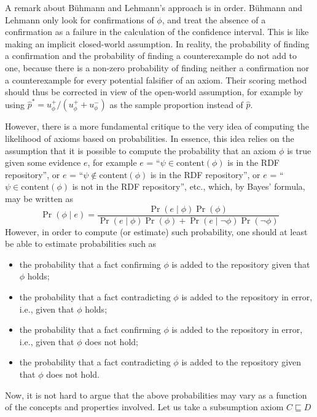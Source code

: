 \documentclass[review]{elsarticle}
\theoremstyle{definition}
\begin{document}
A remark about B\"uhmann and Lehmann's approach is in order.
B\"uhmann and Lehmann only look for confirmations of $\phi$, and treat
the absence of a confirmation as a failure in the calculation of the confidence interval.
This is like making an implicit closed-world assumption. In reality, the probability
of finding a confirmation and the probability of finding a counterexample do not add to one,
because there is a non-zero probability of finding neither a confirmation nor a counterexample
for every potential falsifier of an axiom. Their scoring method should thus be
corrected in view of the open-world assumption, for example by using
$\hat{p}^* = u_\phi^+/(u_\phi^+ + u_\phi^-)$ as the sample proportion instead of $\hat{p}$.

However, there is a more fundamental critique to the very idea of computing the likelihood
of axioms based on probabilities. In essence, this idea relies on the assumption
that it is possible to compute the probability that an axiom $\phi$ is true given
some evidence $e$, for example $e$ = ``$\psi \in \mathrm{content}(\phi)$ is in the RDF repository'',
or $e$ = ``$\psi \notin \mathrm{content}(\phi)$ is in the RDF repository'',
or $e$ = ``$\psi \in \mathrm{content}(\phi)$ is not in the RDF repository'', etc.,
which, by Bayes' formula, may be written as
\begin{equation}
  \Pr(\phi \mid e) =
    \frac{\Pr(e \mid \phi)\Pr(\phi)}{\Pr(e \mid \phi)\Pr(\phi) + \Pr(e \mid \neg\phi)\Pr(\neg\phi)}
\end{equation}
However, in order to compute (or estimate) such probability,
one should at least be able to estimate probabilities such as
\begin{itemize}
\item the probability that a fact confirming $\phi$ is added to the repository
  given that $\phi$ holds;
\item the probability that a fact contradicting $\phi$ is added to the repository
  in error, i.e., given that $\phi$ holds;
\item the probability that a fact confirming $\phi$ is added to the repository
  in error, i.e., given that $\phi$ does not hold;
\item the probability that a fact contradicting $\phi$ is added to the repository
  given that $\phi$ does not hold.
\end{itemize}
Now, it is not hard to argue that the above probabilities may vary as a function of the
concepts and properties involved. Let us take a subsumption axiom $C \sqsubseteq D$
\end{document}
